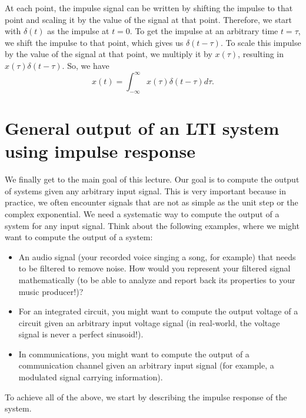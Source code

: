\documentclass{ee102_notes}
\begin{document}
At each point, the impulse signal can be written by shifting the impulse to that point and scaling it by the value of the signal at that point. Therefore, we start with $\delta(t)$ as the impulse at $t=0$. To get the impulse at an arbitrary time $t=\tau$, we shift the impulse to that point, which gives us $\delta(t - \tau)$. To scale this impulse by the value of the signal at that point, we multiply it by $x(\tau)$, resulting in $x(\tau) \delta(t - \tau)$. So, we have
\[
x(t) = \int_{-\infty}^{\infty} x(\tau) \delta(t - \tau) d\tau.
\]
\section{General output of an LTI system using impulse response}
We finally get to the main goal of this lecture. Our goal is to compute the output of systems given any arbitrary input signal. This is very important because in practice, we often encounter signals that are not as simple as the unit step or the complex exponential. We need a systematic way to compute the output of a system for any input signal. Think about the following examples, where we might want to compute the output of a system:
\begin{itemize}
    \item An audio signal (your recorded voice singing a song, for example) that needs to be filtered to remove noise. How would you represent your filtered signal mathematically (to be able to analyze and report back its properties to your music producer!)?
    \item For an integrated circuit, you might want to compute the output voltage of a circuit given an arbitrary input voltage signal (in real-world, the voltage signal is never a perfect sinusoid!).
    \item In communications, you might want to compute the output of a communication channel given an arbitrary input signal (for example, a modulated signal carrying information).
\end{itemize}
To achieve all of the above, we start by describing the impulse response of the system.
\end{document}
